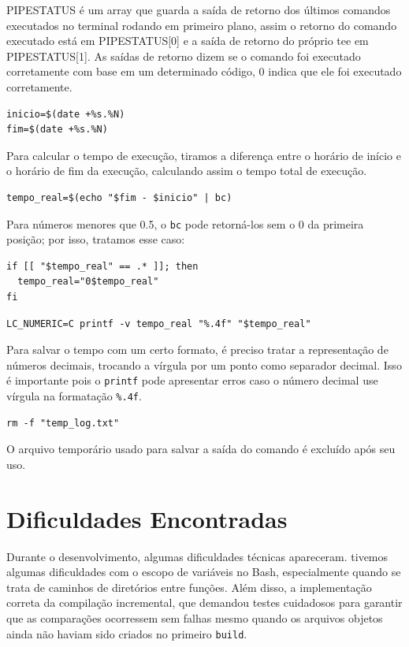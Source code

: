 \documentclass[a4paper]{article}
\begin{document}
PIPESTATUS é um array que guarda a saída de retorno dos últimos comandos executados no terminal rodando em primeiro plano, assim o retorno do comando executado está em PIPESTATUS[0]  e a saída de retorno do próprio tee em PIPESTATUS[1]. As saídas de retorno dizem se o comando foi executado corretamente com base em um determinado código, 0 indica que ele foi executado corretamente. 

\begin{verbatim}
inicio=$(date +%s.%N)
fim=$(date +%s.%N)
\end{verbatim}

Para calcular o tempo de execução, tiramos a diferença entre o horário de início e o horário de fim da execução, calculando assim o tempo total de execução.

\begin{verbatim}
tempo_real=$(echo "$fim - $inicio" | bc)
\end{verbatim}

Para números menores que 0.5, o \texttt{bc} pode retorná-los sem o 0 da primeira posição; por isso, tratamos esse caso:

\begin{verbatim}
if [[ "$tempo_real" == .* ]]; then
  tempo_real="0$tempo_real"
fi
\end{verbatim}

\begin{verbatim}
LC_NUMERIC=C printf -v tempo_real "%.4f" "$tempo_real"
\end{verbatim}

Para salvar o tempo com um certo formato, é preciso tratar a representação de números decimais, trocando a vírgula por um ponto como separador decimal. Isso é importante pois o \texttt{printf} pode apresentar erros caso o número decimal use vírgula na formatação \texttt{\%.4f}.

\begin{verbatim}
rm -f "temp_log.txt"
\end{verbatim}

O arquivo temporário usado para salvar a saída do comando é excluído após seu uso.

\section{Dificuldades Encontradas}
Durante o desenvolvimento, algumas dificuldades técnicas apareceram. tivemos algumas dificuldades com o escopo de variáveis no Bash, especialmente quando se trata de caminhos de diretórios entre funções. Além disso,  a implementação correta da compilação incremental, que demandou testes cuidadosos para garantir que as comparações ocorressem sem falhas mesmo quando os arquivos objetos ainda não haviam sido criados no primeiro \texttt{build}.
\end{document}
